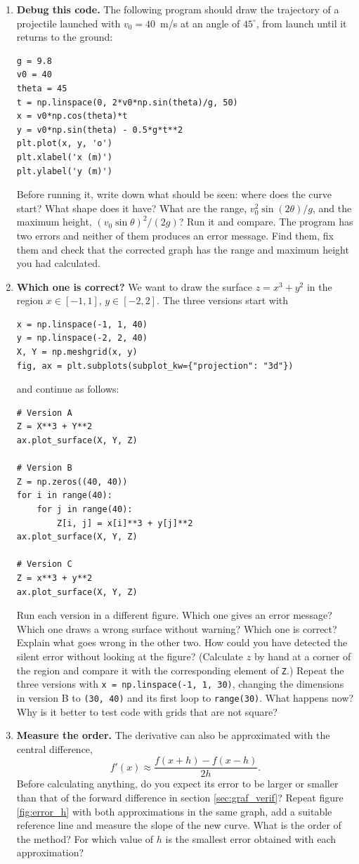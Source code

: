 \begin{enumerate}
\item \textbf{Debug this code.} The following program should draw the trajectory of a projectile launched with $v_0=40$~m/s at an angle of $45^\circ$, from launch until it returns to the ground:
\begin{verbatim}
g = 9.8
v0 = 40
theta = 45
t = np.linspace(0, 2*v0*np.sin(theta)/g, 50)
x = v0*np.cos(theta)*t
y = v0*np.sin(theta) - 0.5*g*t**2
plt.plot(x, y, 'o')
plt.xlabel('x (m)')
plt.ylabel('y (m)')
\end{verbatim}
Before running it, write down what should be seen: where does the curve start? What shape does it have? What are the range, $v_0^2\sin(2\theta)/g$, and the maximum height, $(v_0\sin\theta)^2/(2g)$? Run it and compare. The program has two errors and neither of them produces an error message. Find them, fix them and check that the corrected graph has the range and maximum height you had calculated.

\item\label{ej:mesh_cual-en} \textbf{Which one is correct?} We want to draw the surface $z=x^3+y^2$ in the region $x\in[-1,1]$, $y\in[-2,2]$. The three versions start with
\begin{verbatim}
x = np.linspace(-1, 1, 40)
y = np.linspace(-2, 2, 40)
X, Y = np.meshgrid(x, y)
fig, ax = plt.subplots(subplot_kw={"projection": "3d"})
\end{verbatim}
and continue as follows:
\begin{verbatim}
# Version A
Z = X**3 + Y**2
ax.plot_surface(X, Y, Z)

# Version B
Z = np.zeros((40, 40))
for i in range(40):
    for j in range(40):
        Z[i, j] = x[i]**3 + y[j]**2
ax.plot_surface(X, Y, Z)

# Version C
Z = x**3 + y**2
ax.plot_surface(X, Y, Z)
\end{verbatim}
Run each version in a different figure. Which one gives an error message? Which one draws a wrong surface without warning? Which one is correct? Explain what goes wrong in the other two. How could you have detected the silent error without looking at the figure? (Calculate $z$ by hand at a corner of the region and compare it with the corresponding element of \texttt{Z}.) Repeat the three versions with \texttt{x = np.linspace(-1, 1, 30)}, changing the dimensions in version B to \texttt{(30, 40)} and its first loop to \texttt{range(30)}. What happens now? Why is it better to test code with grids that are not square?

\item \textbf{Measure the order.} The derivative can also be approximated with the central difference,
$$f'(x)\approx\frac{f(x+h)-f(x-h)}{2h}.$$
Before calculating anything, do you expect its error to be larger or smaller than that of the forward difference in section \ref{sec:graf_verif}? Repeat figure \ref{fig:error_h} with both approximations in the same graph, add a suitable reference line and measure the slope of the new curve. What is the order of the method? For which value of $h$ is the smallest error obtained with each approximation?


\end{enumerate}
